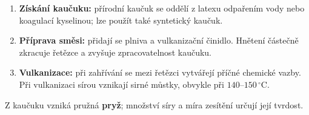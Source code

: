 \begin{enumerate}
\item \textbf{Získání kaučuku:} přírodní kaučuk se oddělí z latexu odpařením vody nebo koagulací kyselinou; lze použít také syntetický kaučuk.
\item \textbf{Příprava směsi:} přidají se plniva a vulkanizační činidlo. Hnětení částečně zkracuje řetězce a zvyšuje zpracovatelnost kaučuku.
\item \textbf{Vulkanizace:} při zahřívání se mezi řetězci vytvářejí příčné chemické vazby. Při vulkanizaci sírou vznikají sirné můstky, obvykle při $140$--$150\,^{\circ}\mathrm C$.
\end{enumerate}
Z kaučuku vzniká pružná \textbf{pryž}; množství síry a míra zesítění určují její tvrdost.
